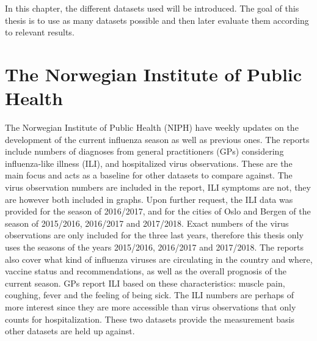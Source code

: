 In this chapter, the different datasets used will be introduced. The goal of this thesis is to use as many datasets possible and then later evaluate them according to relevant results.

\section{The Norwegian Institute of Public Health}
The Norwegian Institute of Public Health (NIPH) have weekly updates\cite{fhi} on the development of the current influenza season as well as previous ones. The reports include numbers of diagnoses from general practitioners (GPs) considering influenza-like illness (ILI), and hospitalized virus observations. These are the main focus and acts as a baseline for other datasets to compare against. The virus observation numbers are included in the report, ILI symptoms are not, they are however both included in graphs. Upon further request, the ILI data was provided for the season of 2016/2017, and for the cities of Oslo and Bergen of the season of 2015/2016, 2016/2017 and 2017/2018. Exact numbers of the virus observations are only included for the three last years, therefore this thesis only uses the seasons of the years 2015/2016, 2016/2017 and 2017/2018. The reports also cover what kind of influenza viruses are circulating in the country and where, vaccine status and recommendations, as well as the overall prognosis of the current season. GPs report ILI based on these characteristics: muscle pain, coughing, fever and the feeling of being sick. The ILI numbers are perhaps of more interest since they are more accessible than virus observations that only counts for hospitalization. These two datasets provide the measurement basis other datasets are held up against.

